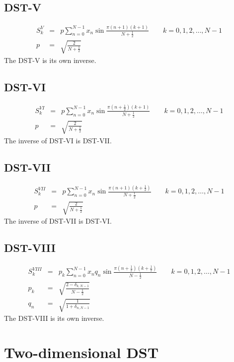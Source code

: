 \documentclass[12pt]{article}
\begin{document}
\subsection{DST-V}
\begin{eqnarray*}
S^V_k&=&p \sum _{n=0}^{N-1} x_n \sin \frac{\pi (n+1) (k+1)}{N+\frac{1}{2}} \quad \quad k=0, 1, 2, \dots, N-1\\
p&=&\sqrt{\frac{2}{N+\frac{1}{2}}}
\end{eqnarray*}
The DST-V is its own inverse.

\subsection{DST-VI}
\begin{eqnarray*}
S^{VI}_k&=&p \sum _{n=0}^{N-1} x_n \sin \frac{\pi \left(n+\frac{1}{2}\right) (k+1)}{N+\frac{1}{2}} \quad \quad k=0, 1, 2, \dots, N-1\\
p&=&\sqrt{\frac{2}{N+\frac{1}{2}}}
\end{eqnarray*}
The inverse of DST-VI is DST-VII.

\subsection{DST-VII}
\begin{eqnarray*}
S^{VII}_k&=&p \sum _{n=0}^{N-1} x_n \sin \frac{\pi (n+1) \left(k+\frac{1}{2}\right)}{N+\frac{1}{2}} \quad \quad k=0, 1, 2, \dots, N-1\\
p&=&\sqrt{\frac{2}{N+\frac{1}{2}}}
\end{eqnarray*}
The inverse of DST-VII is DST-VI.

\subsection{DST-VIII}
\begin{eqnarray*}
S^{VIII}_k&=&p_k \sum _{n=0}^{N-1} x_n q_n \sin \frac{\pi \left(n+\frac{1}{2}\right) \left(k+\frac{1}{2}\right)}{N-\frac{1}{2}} \quad \quad k=0, 1, 2, \dots, N-1\\
p_k&=&\sqrt{\frac{2-\delta _{k,N-1}}{N-\frac{1}{2}}}\\
q_n&=&\sqrt{\frac{1}{1+\delta _{n,N-1}}}
\end{eqnarray*}
The DST-VIII is its own inverse.

\section{Two-dimensional DST}
\end{document}

